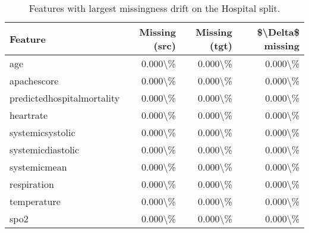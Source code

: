 \begin{table}
\caption{Features with largest missingness drift on the Hospital split.}
\label{tab:missingness-hospital}
\begin{tabular}{lrrr}
\toprule
Feature & Missing (src) & Missing (tgt) & \$\textbackslash Delta\$ missing \\
\midrule
age & 0.000\textbackslash \% & 0.000\textbackslash \% & 0.000\textbackslash \% \\
apachescore & 0.000\textbackslash \% & 0.000\textbackslash \% & 0.000\textbackslash \% \\
predictedhospitalmortality & 0.000\textbackslash \% & 0.000\textbackslash \% & 0.000\textbackslash \% \\
heartrate & 0.000\textbackslash \% & 0.000\textbackslash \% & 0.000\textbackslash \% \\
systemicsystolic & 0.000\textbackslash \% & 0.000\textbackslash \% & 0.000\textbackslash \% \\
systemicdiastolic & 0.000\textbackslash \% & 0.000\textbackslash \% & 0.000\textbackslash \% \\
systemicmean & 0.000\textbackslash \% & 0.000\textbackslash \% & 0.000\textbackslash \% \\
respiration & 0.000\textbackslash \% & 0.000\textbackslash \% & 0.000\textbackslash \% \\
temperature & 0.000\textbackslash \% & 0.000\textbackslash \% & 0.000\textbackslash \% \\
spo2 & 0.000\textbackslash \% & 0.000\textbackslash \% & 0.000\textbackslash \% \\
\bottomrule
\end{tabular}
\end{table}
